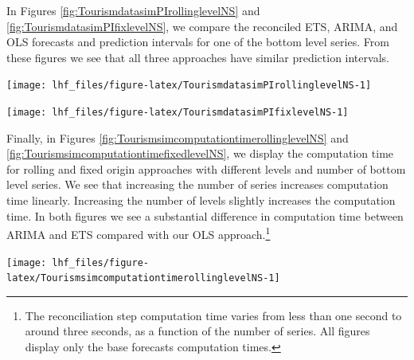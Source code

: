 \documentclass[11pt,a4paper,]{article}
\let\origfigure\figure
\let\endorigfigure\endfigure
\renewenvironment{figure}[1][2] {
    \expandafter\origfigure\expandafter[!htbp]
} {
    \endorigfigure
}
\begin{document}
In Figures \ref{fig:TourismdatasimPIrollinglevelNS} and \ref{fig:TourismdatasimPIfixlevelNS}, we compare the reconciled ETS, ARIMA, and OLS forecasts and prediction intervals for one of the bottom level series. From these figures we see that all three approaches have similar prediction intervals.

\begin{figure}

{\centering \texttt{[image: lhf\_files/figure-latex/TourismdatasimPIrollinglevelNS-1]} 

}

\caption{Comparing reconciled rolling origin forecasts and prediction intervals for a sample bottom-level series, for different number of bottom-level series and hierarchy levels (different panels). Simulated series has error value 0.5 and 24 months test set.}\label{fig:TourismdatasimPIrollinglevelNS}
\end{figure}

\begin{figure}

{\centering \texttt{[image: lhf\_files/figure-latex/TourismdatasimPIfixlevelNS-1]} 

}

\caption{Comparing reconciled fixed origin forecasts and prediction intervals for a sample bottom-level series, for different number of bottom-level series and hierarchy levels (different panels). Simulated series has error value 0.5 and 24 months test set.}\label{fig:TourismdatasimPIfixlevelNS}
\end{figure}

Finally, in Figures \ref{fig:TourismsimcomputationtimerollinglevelNS} and \ref{fig:TourismsimcomputationtimefixedlevelNS}, we display the computation time for rolling and fixed origin approaches with different levels and number of bottom level series. We see that increasing the number of series increases computation time linearly. Increasing the number of levels slightly increases the computation time. In both figures we see a substantial difference in computation time between ARIMA and ETS compared with our OLS approach.\footnote{The reconciliation step computation time varies from less than one second to around three seconds, as a function of the number of series. All figures display only the base forecasts computation times.}

\begin{figure}

{\centering \texttt{[image: lhf\_files/figure-latex/TourismsimcomputationtimerollinglevelNS-1]} 

}

\caption{Computation time (seconds) for rolling origin reconciled forecasts using ETS, ARIMA and OLS, by number of bottom-level series (x-axis), and by levels of hierarchy (panels). Simulated series has error value 0.5 and 24 months test set.}\label{fig:TourismsimcomputationtimerollinglevelNS}
\end{figure}
\end{document}
